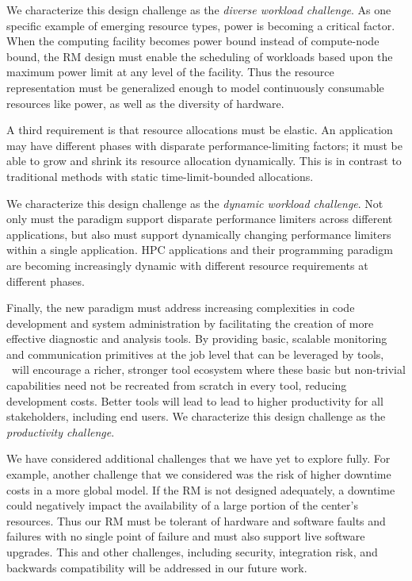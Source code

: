 We characterize this design challenge as the {\em diverse workload
challenge}.   As one specific example of emerging resource types,
power is becoming a critical factor. When the computing facility
becomes power bound instead of compute-node bound, the RM design
must enable the scheduling of workloads based upon the maximum
power limit at any level of the facility. Thus the resource
representation must be generalized enough to model continuously consumable
resources like power, as well as the diversity of hardware.

A third requirement is that resource allocations
must be elastic. An application may have different
phases with disparate performance-limiting factors;
it must be able to grow and shrink its resource allocation
dynamically.  This is in contrast to traditional methods with
static time-limit-bounded allocations.

We characterize this design challenge as the {\em dynamic workload
challenge}.  
Not only must the paradigm support disparate performance limiters
across different applications, but also must support dynamically
changing performance limiters within a single application.  HPC applications
and their programming paradigm are becoming increasingly dynamic with
different resource requirements at different phases.

Finally, the new paradigm must address increasing complexities
in code development and system administration by facilitating
the creation of more effective diagnostic and analysis tools.
By providing basic, scalable monitoring and communication
primitives at the job level that can be leveraged by tools,
\flux\ will encourage a richer, stronger tool ecosystem where
these basic but non-trivial capabilities need not be recreated
from scratch in every tool, reducing development costs.
Better tools will lead to lead to higher productivity for all
stakeholders, including end users.
We characterize this design challenge as the {\em productivity challenge}.

We have considered additional challenges that we
have yet to explore fully. For example,
another challenge that we considered was 
the risk of higher downtime costs in a more global model.
If the RM is not designed adequately, a downtime could negatively
impact the availability of a large portion of the center's
resources. Thus our RM must be tolerant of hardware and software
faults and failures with no single point of failure and must
also support live software upgrades. This and other challenges,
including security, integration risk, and backwards compatibility 
will be addressed in our future work.

%
